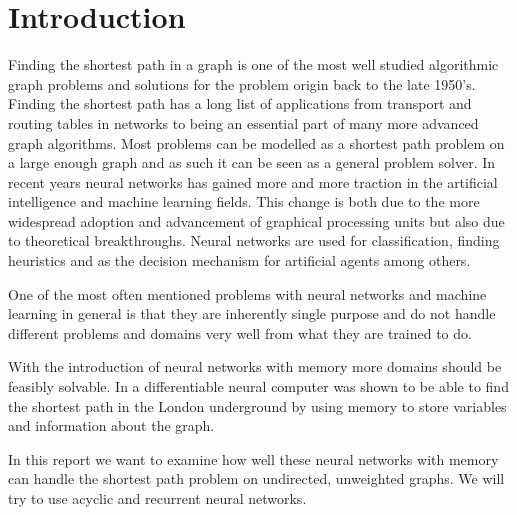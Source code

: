 
\section{Introduction}
Finding the shortest path in a graph is one of the most well studied algorithmic graph problems and solutions for the problem origin back to the late 1950's. Finding the shortest path has a long list of applications from transport and routing tables in networks to being an essential part of many more advanced graph algorithms. Most problems can be modelled as a shortest path problem on a large enough graph and as such it can be seen as a general problem solver. In recent years neural networks has gained more and more traction in the artificial intelligence and machine learning fields. This change is both due to the more widespread adoption and advancement of graphical processing units but also due to theoretical breakthroughs. Neural networks are used for classification, finding heuristics and as the decision mechanism for artificial agents among others.

\newpar One of the most often mentioned problems with neural networks and machine learning in general is that they are inherently single purpose and do not handle different problems and domains very well from what they are trained to do.

\newpar With the introduction of neural networks with memory more domains should be feasibly solvable. In \cite{graves2016hybrid} a differentiable neural computer was shown to be able to find the shortest path in the London underground by using memory to store variables and information about the graph.

\newpar In this report we want to examine how well these neural networks with memory can handle the shortest path problem on undirected, unweighted graphs. We will try to use acyclic and recurrent neural networks.